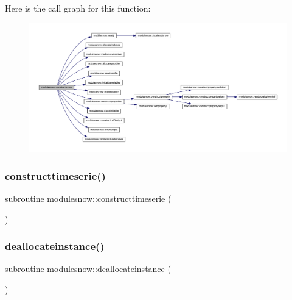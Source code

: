 Here is the call graph for this function\+:\nopagebreak
\begin{figure}[H]
\begin{center}
\leavevmode
\includegraphics[width=350pt]{namespacemodulesnow_af7722587c67638fd4a4d05e998e957b0_cgraph}
\end{center}
\end{figure}
\mbox{\label{namespacemodulesnow_aad7eea4b66e4c45d4d4cc09cacabb4a4}} 
\subsubsection{\texorpdfstring{constructtimeserie()}{constructtimeserie()}}
{\footnotesize\ttfamily subroutine modulesnow\+::constructtimeserie (\begin{DoxyParamCaption}{ }\end{DoxyParamCaption})\hspace{0.3cm}{\ttfamily [private]}}

\mbox{\label{namespacemodulesnow_ac9029191079e3096a3bb36742e4d578f}} 
\subsubsection{\texorpdfstring{deallocateinstance()}{deallocateinstance()}}
{\footnotesize\ttfamily subroutine modulesnow\+::deallocateinstance (\begin{DoxyParamCaption}{ }\end{DoxyParamCaption})\hspace{0.3cm}{\ttfamily [private]}}

